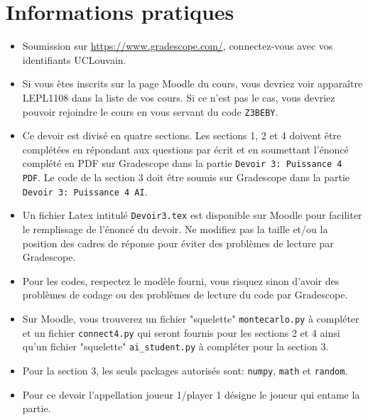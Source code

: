 \documentclass[11pt,answers]{exam}
\begin{document}
\section*{Informations pratiques}
\begin{itemize}
	\setlength{\itemsep}{0mm}
	\item Soumission sur \url{https://www.gradescope.com/}, connectez-vous avec vos identifiants UCLouvain.
	\item Si vous êtes inscrits sur la page Moodle du cours, vous devriez voir apparaître LEPL1108 dans la liste de vos cours. Si ce n'est pas le cas, vous devriez pouvoir rejoindre le cours en vous servant du code \texttt{Z3BEBY}.
	\item Ce devoir est divisé en quatre sections. Les sections 1, 2 et 4 doivent \^etre complétées en répondant aux questions par écrit et en soumettant l'énoncé complété en PDF sur Gradescope dans la partie \texttt{Devoir 3: Puissance 4 PDF}. Le code de la section 3 doit \^etre soumis sur Gradescope dans la partie \texttt{Devoir 3: Puissance 4 AI}.
	\item Un fichier Latex intitulé \texttt{Devoir3.tex} est disponible sur Moodle pour faciliter le remplissage de l'énoncé du devoir. Ne modifiez pas la taille et/ou la position des cadres de réponse pour éviter des problèmes de lecture par Gradescope.
	\item Pour les codes, respectez le modèle fourni, vous risquez sinon d’avoir des problèmes de codage ou des problèmes de lecture du code par Gradescope.
	\item Sur Moodle, vous trouverez un fichier "squelette" \texttt{montecarlo.py} à compléter et un fichier \texttt{connect4.py} qui seront fournis pour les sections 2 et 4 ainsi qu'un fichier "squelette" \texttt{ai\_student.py} à compléter pour la section 3.
	\item Pour la section 3, les seuls packages autorisés sont: \texttt{numpy}, \texttt{math} et \texttt{random}.
	\item Pour ce devoir l'appellation joueur 1/player 1 désigne le joueur qui entame la partie.
\end{itemize}


\newpage
\end{document}
